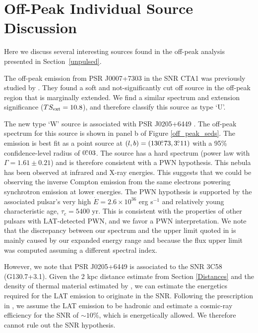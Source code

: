 \section{Off-Peak Individual Source Discussion}
\label{off_peak_individual_source_discussion}

Here we discuss several interesting sources found in the off-peak
analysis presented in Section~\ref{unpulsed}.

The off-peak emission from PSR J0007+7303 in the SNR CTA1 was previously studied by \cite{Fermi_CTA1_2012}.
They found a soft and not-significantly cut off source in the off-peak region that
is marginally extended.
We find a similar spectrum and extension significance ($TS_{\rm ext}=10.8$), and therefore classify this
source as type `U'.


The new type `W' source is associated with PSR J0205+6449 \citep{LATPSR0205}.
The off-peak spectrum for this source is shown in panel b of Figure
\ref{off_peak_seds}.  The emission is best fit as a point source at
$(l,b)=(130\mbox{$.\!\!^\circ$}73,3\mbox{$.\!\!^\circ$}11)$ with a 95\% confidence-level radius of $0\mbox{$.\!\!^\circ$}03$.
The source has a hard spectrum (power law with $\Gamma=1.61\pm0.21$)
and is therefore consistent with a PWN hypothesis.
This nebula has been observed at infrared
\citep{3C58_IR_PWN} and X-ray \citep{3C58_Xray_PWN} energies. This
suggests that we could be observing the inverse Compton emission from
the same electrons powering synchrotron emission at lower energies.
The PWN hypothesis is supported by the associated pulsar's
very high $\dot E=2.6\times10^{36}$ erg s$^{-1}$ and relatively young
characteristic age, $\tau_c = 5400$ yr. This is consistent with the properties
of other pulsars with LAT-detected PWN, and we favor a PWN
interpretation.
We note that the discrepancy between our spectrum and the upper limit
quoted in \citet{LAT_collaboration_PWNCAT_2011} is mainly caused by
our expanded energy range and because the flux upper limit was computed
assuming a different spectral index.


However, we note that PSR J0205+6449 is associated to the SNR 3C58
(G130.7+3.1).  Given the 2 kpc distance estimate from Section \ref{Distances}
and the density of thermal material estimated by \cite{3C58_Xray_PWN}, we can estimate
the energetics required for the LAT emission to originate in the SNR.
Following the prescription in \cite{Gamma_Visibility_SNRs_Drury_1994},
we assume the LAT emission to be hadronic and estimate a cosmic-ray
efficiency for the SNR of $\sim10$\%, which is energetically allowed.
We therefore cannot rule out the SNR hypothesis.

